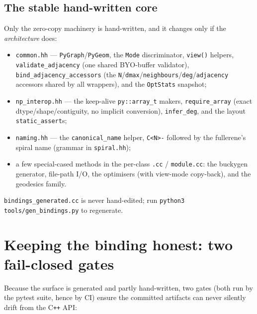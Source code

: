 \documentclass[11pt]{article}
\newcommand{\code}[1]{\lstinline[style=py]!#1!}
\begin{document}
\subsection{The stable hand-written core}
Only the zero-copy machinery is hand-written, and it changes only if the
\emph{architecture} does:
\begin{itemize}[leftmargin=1.4em]
\item \texttt{common.hh} --- \code{PyGraph}/\code{PyGeom}, the \texttt{Mode} discriminator,
  \code{view()} helpers, \code{validate_adjacency} (one shared BYO-buffer validator),
  \code{bind_adjacency_accessors} (the \code{N}/\code{dmax}/\code{neighbours}/\code{deg}/\code{adjacency}
  accessors shared by all wrappers), and the \code{OptStats} snapshot;
\item \texttt{np\_interop.hh} --- the keep-alive \code{py::array_t} makers, \code{require_array}
  (exact dtype/shape/contiguity, no implicit conversion), \code{infer_deg}, and the layout
  \code{static_assert}s;
\item \texttt{naming.hh} --- the \code{canonical_name} helper, \texttt{C<N>-} followed by
  the fullerene's spiral name (grammar in \texttt{spiral.hh});
\item a few special-cased methods in the per-class \texttt{.cc} / \texttt{module.cc}: the
  buckygen generator, file-path I/O, the optimisers (with view-mode copy-back), and the
  geodesics family.
\end{itemize}
\code{bindings_generated.cc} is never hand-edited; run \code{python3 tools/gen_bindings.py}
to regenerate.

\section{Keeping the binding honest: two fail-closed gates}
\label{sec:gates}

Because the surface is generated and partly hand-written, two gates (both run by the pytest
suite, hence by CI) ensure the committed artifacts can never silently drift from the C\texttt{++}
API:
\end{document}

